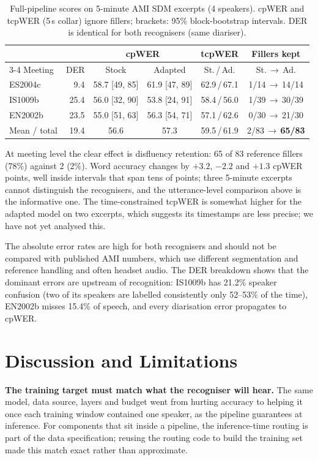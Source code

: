 \documentclass[conference]{IEEEtran}
\begin{document}
\begin{table}[t]
\caption{Full-pipeline scores on 5-minute AMI SDM excerpts (4 speakers). cpWER and tcpWER (5\,s collar) ignore fillers; brackets: 95\% block-bootstrap intervals. DER is identical for both recognisers (same diariser).}
\label{tab:meeting}
\centering\footnotesize\setlength{\tabcolsep}{2pt}
\begin{tabular}{@{}lrcccc@{}}
\toprule
& & \multicolumn{2}{c}{cpWER} & tcpWER & Fillers kept \\
\cmidrule(lr){3-4}
Meeting & DER & Stock & Adapted & St.\,/\,Ad. & St.\,$\to$\,Ad. \\
\midrule
ES2004c & 9.4 & 58.7 {\scriptsize[49, 85]} & 61.9 {\scriptsize[47, 89]} & 62.9\,/\,67.1 & 1/14\,$\to$\,14/14 \\
IS1009b & 25.4 & 56.0 {\scriptsize[32, 90]} & 53.8 {\scriptsize[24, 91]} & 58.4\,/\,56.0 & 1/39\,$\to$\,30/39 \\
EN2002b & 23.5 & 55.0 {\scriptsize[51, 63]} & 56.3 {\scriptsize[54, 71]} & 57.1\,/\,62.6 & 0/30\,$\to$\,21/30 \\
\midrule
Mean / total & 19.4 & 56.6 & 57.3 & 59.5\,/\,61.9 & 2/83\,$\to$\,\textbf{65/83} \\
\bottomrule
\end{tabular}
\end{table}

At meeting level the clear effect is disfluency retention: 65 of 83 reference fillers (78\%) against 2 (2\%). Word accuracy changes by $+3.2$, $-2.2$ and $+1.3$ cpWER points, well inside intervals that span tens of points; three 5-minute excerpts cannot distinguish the recognisers, and the utterance-level comparison above is the informative one. The time-constrained tcpWER is somewhat higher for the adapted model on two excerpts, which suggests its timestamps are less precise; we have not yet analysed this.

The absolute error rates are high for both recognisers and should not be compared with published AMI numbers, which use different segmentation and reference handling and often headset audio. The DER breakdown shows that the dominant errors are upstream of recognition: IS1009b has 21.2\% speaker confusion (two of its speakers are labelled consistently only 52--53\% of the time), EN2002b misses 15.4\% of speech, and every diarisation error propagates to cpWER.

\section{Discussion and Limitations}
\textbf{The training target must match what the recogniser will hear.} The same model, data source, layers and budget went from hurting accuracy to helping it once each training window contained one speaker, as the pipeline guarantees at inference. For components that sit inside a pipeline, the inference-time routing is part of the data specification; reusing the routing code to build the training set made this match exact rather than approximate.
\end{document}
